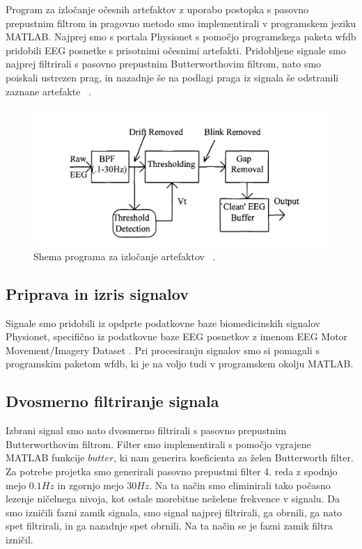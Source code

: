 \documentclass[9pt]{IEEEtran}
\begin{document}
Program za izločanje očesnih artefaktov z uporabo postopka s pasovno prepustnim filtrom in pragovno metodo smo implementirali v programskem jeziku MATLAB. Najprej smo s portala Physionet s pomočjo programskega paketa wfdb pridobili EEG posnetke s prisotnimi očesnimi artefakti. Pridobljene signale smo najprej filtrirali s pasovno prepustnim Butterworthovim filtrom, nato smo poiskali ustrezen prag, in nazadnje še na podlagi praga iz signala še odstranili zaznane artefakte ~\cite{ochoa2002eeg}.

\begin{figure}[!htb]
\centering
\includegraphics[width=1\columnwidth]{shema.png}
\caption[c1]{ Shema programa za izločanje artefaktov ~\cite{gupta1996preprocessing}. }
\label{fig_1}
\end{figure}

\subsection{Priprava in izris signalov}

Signale smo pridobili iz opdprte podatkovne baze biomedicinskih signalov Physionet, specifično iz podatkovne baze EEG posnetkov z imenom EEG Motor Movement/Imagery Dataset \cite{goldberger2000physiobank, schalk2004bci2000}. Pri procesiranju signalov smo si pomagali s programskim paketom wfdb, ki je na voljo tudi v programskem okolju MATLAB.

\subsection{Dvosmerno filtriranje signala}

Izbrani signal smo nato dvosmerno filtrirali s pasovno prepustnim Butterworthovim filtrom. Filter smo implementirali s pomočjo vgrajene MATLAB funkcije $butter$, ki nam generira koeficienta za želen Butterworth filter. Za potrebe projetka smo generirali pasovno prepustmi filter 4. reda z spodnjo mejo $0.1 Hz$ in zgornjo mejo $30 Hz$. Na ta način smo eliminirali tako počasno lezenje ničelnega nivoja, kot ostale morebitne neželene frekvence v signalu. Da smo izničili fazni zamik signala, smo signal najprej filtrirali, ga obrnili, ga nato spet filtrirali, in ga nazadnje spet obrnili. Na ta način se je fazni zamik filtra izničil.
\end{document}
